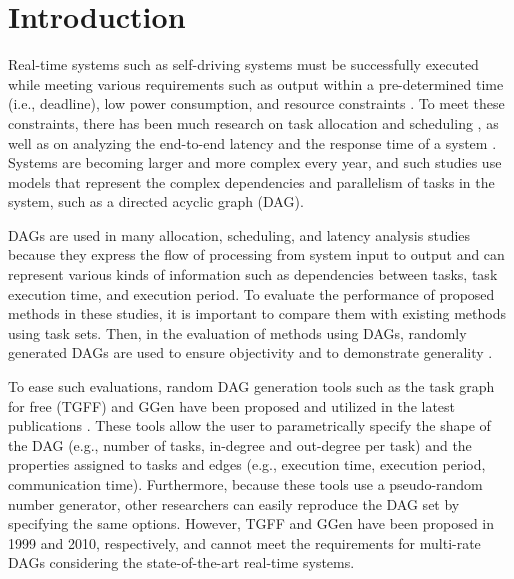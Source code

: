 \section{Introduction}
\label{sec: introduction}

Real-time systems such as self-driving systems must be successfully executed while meeting various requirements such as output within a pre-determined time (i.e., deadline), low power consumption, and resource constraints \cite{koike2021federated, senapati2021hmds, kaur2020deep}.
To meet these constraints, there has been much research on task allocation and scheduling \cite{igarashi2021accurate, asghari2020online, tong2020ql}, as well as on analyzing the end-to-end latency and the response time of a system \cite{yang2020exploring, kordon2020evaluation, chen2021partial}.
Systems are becoming larger and more complex every year, and such studies use models that represent the complex dependencies and parallelism of tasks in the system, such as a directed acyclic graph (DAG).

DAGs are used in many allocation, scheduling, and latency analysis studies \cite{choi2021picas, nguyen2019cache, klaus2021constrained} because they express the flow of processing from system input to output and can represent various kinds of information such as dependencies between tasks, task execution time, and execution period.
To evaluate the performance of proposed methods in these studies, it is important to compare them with existing methods using task sets.
Then, in the evaluation of methods using DAGs, randomly generated DAGs are used to ensure objectivity and to demonstrate generality \cite{he2021response, verucchi2020latency, senapati2021hmds}.

To ease such evaluations, random DAG generation tools such as the task graph for free (TGFF) \cite{tgff} and GGen \cite{cordeiro2010random} have been proposed and utilized in the latest publications \cite{sun2021deepweave, huang2020hda, rouxel-free, cao2018affinity}.
These tools allow the user to parametrically specify the shape of the DAG (e.g., number of tasks, in-degree and out-degree per task) and the properties assigned to tasks and edges (e.g., execution time, execution period, communication time).
Furthermore, because these tools use a pseudo-random number generator, other researchers can easily reproduce the DAG set by specifying the same options.
However, TGFF and GGen have been proposed in 1999 and 2010, respectively, and cannot meet the requirements for multi-rate DAGs considering the state-of-the-art real-time systems.


